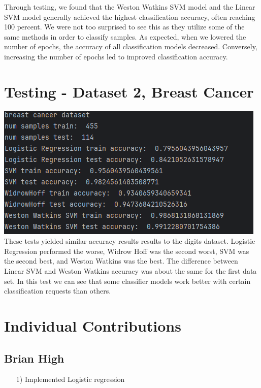 \documentclass{article}
\begin{document}
Through testing, we found that the Weston Watkins SVM model and the Linear SVM model generally achieved the highest classification accuracy, often reaching 100 percent. We were not too surprised to see this as they utilize some of the same methods in order to classify samples. As expected, when we lowered the number of epochs, the accuracy of all classification models decreased. Conversely, increasing the number of epochs led to improved classification accuracy.

\section{Testing - Dataset 2, Breast Cancer}
\includegraphics[scale=0.75]{../figs/BreastCancer.png} \\[0.5cm]

These tests yielded similar accuracy results results to the digits dataset. Logistic Regression performed the worse, Widrow Hoff was the second worst, SVM was the second best, and Weston Watkins was the best. The difference between Linear SVM and Weston Watkins accuracy was about the same for the first data set. In this test we can see that some classifier models work better with certain classification requests than others.


\section{Individual Contributions}

\subsection{Brian High}
\begin{itemize}
    \item[1)] Implemented Logistic regression
\end{itemize}
\end{document}
